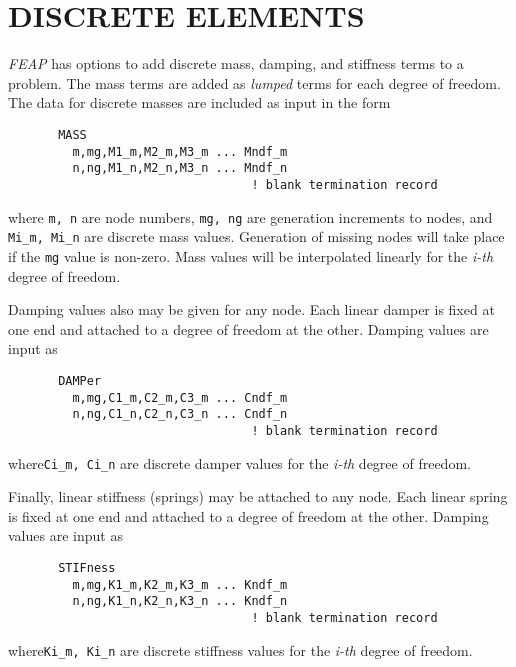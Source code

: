 \chapter[Discrete Elements]{DISCRETE ELEMENTS}
\label{diselm}

{\sl FEAP} has options to add discrete mass, damping, and stiffness
terms to a problem.  The mass terms are added as {\it lumped} terms
for each degree of freedom.  The data for discrete masses are
included as input in the form
\begin{verbatim}
       MASS
         m,mg,M1_m,M2_m,M3_m ... Mndf_m
         n,ng,M1_n,M2_n,M3_n ... Mndf_n
                                  ! blank termination record
\end{verbatim}
where {\tt m, n} are node numbers, {\tt mg, ng} are generation increments
to nodes, and {\tt Mi\_m, Mi\_n} are discrete mass values.
Generation of missing nodes will take place if the {\tt mg} value is
non-zero.  Mass values will be interpolated linearly for the {\it i-th}
degree of freedom.

Damping values also may be given for any node.  Each linear damper is
fixed at one end and attached to a degree of freedom at the other.
Damping values are input as
\begin{verbatim}
       DAMPer
         m,mg,C1_m,C2_m,C3_m ... Cndf_m
         n,ng,C1_n,C2_n,C3_n ... Cndf_n
                                  ! blank termination record
\end{verbatim}
where{\tt Ci\_m, Ci\_n} are discrete damper values for the {\it i-th}
degree of freedom.

Finally, linear stiffness (springs)
may be attached to any node.  Each linear spring is
fixed at one end and attached to a degree of freedom at the other.
Damping values are input as
\begin{verbatim}
       STIFness
         m,mg,K1_m,K2_m,K3_m ... Kndf_m
         n,ng,K1_n,K2_n,K3_n ... Kndf_n
                                  ! blank termination record
\end{verbatim}
where{\tt Ki\_m, Ki\_n} are discrete stiffness values for the {\it i-th}
degree of freedom.
